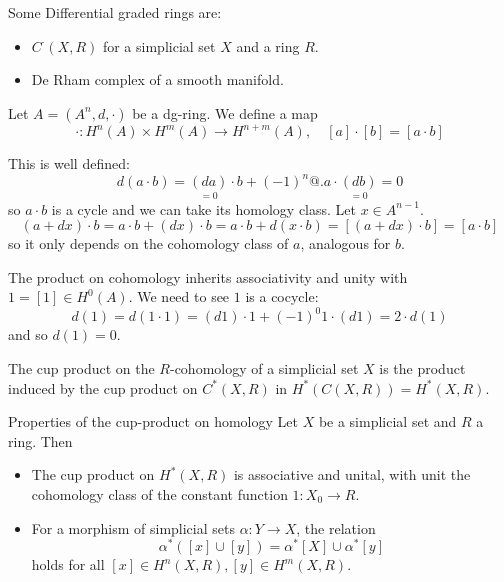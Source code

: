 \documentclass[language=english]{TemplateLecture}
\begin{document}
\begin{example}
    Some Differential graded rings are:
    \begin{itemize}
        \item \(C^\cdot(X,R)\) for a simplicial set \(X\) and a ring \(R\).
        \item De Rham complex of a smooth manifold.
    \end{itemize}

\end{example}

\begin{construction}
    Let \(A = (A^n, d, \cdot)\) be a dg-ring. We define a map
    \[\cdot \colon H^n(A) \times H^m(A) \to H^{n+m}(A), \quad [a] \cdot [b] = [a \cdot b]\]

    This is well defined:
    \[d(a\cdot b) = \underset{= 0}{(da)} \cdot b + (-1)^n @. a \cdot \underset{= 0}{(db)} = 0\]
    so \(a\cdot b\) is a cycle and we can take its homology class. Let \(x \in A^{n-1}\).
    \[(a+ dx) \cdot b = a\cdot b + (dx) \cdot b = a \cdot b + d(x\cdot b) = [(a+dx)\cdot b] = [a \cdot b]\]
    so it only depends on the cohomology class of \(a\), analogous for \(b\).

    The product on cohomology inherits associativity and unity with \(1 = [1] \in H^0(A)\). We need to see \(1\) is a cocycle:
    \[d(1) = d(1\cdot 1) = (d1) \cdot 1 + (-1)^0 1 \cdot (d1) = 2 \cdot d(1)\]
    and so \(d(1) = 0\).

    The cup product on the \(R\)-cohomology of a simplicial set \(X\) is the product induced by the cup product on \(C^*(X,R)\) in \(H^*(C(X,R)) = H^*(X,R)\).
\end{construction}

\begin{thm}{Properties of the cup-product on homology}{}
    Let \(X\) be a simplicial set and \(R\) a ring. Then
    \begin{itemize}
        \item The cup product on \(H^*(X,R)\) is associative and unital, with unit the cohomology class of the constant function \(1\colon X_0 \to R\).
        \item For a morphism of simplicial sets \(\alpha\colon Y \to X\), the relation
        \[\alpha^*([x] \cup [y]) = \alpha^*[X] \cup \alpha^*[y]\]
        holds for all \([x] \in H^n(X,R), [y] \in H^m(X,R)\).
    \end{itemize}
\end{thm}
\end{document}
